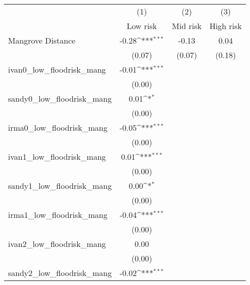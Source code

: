 {
\def\sym#1{\ifmmode^{#1}\else\(^{#1}\)\fi}
\begin{tabular}{l*{3}{c}}
\hline\hline
                    &\multicolumn{1}{c}{(1)}&\multicolumn{1}{c}{(2)}&\multicolumn{1}{c}{(3)}\\
                    &\multicolumn{1}{c}{Low risk}&\multicolumn{1}{c}{Mid risk}&\multicolumn{1}{c}{High risk}\\
\hline
Mangrove Distance   &       -0.28\sym{***}&       -0.13         &        0.04         \\
                    &      (0.07)         &      (0.07)         &      (0.18)         \\
[1em]
ivan0\_low\_floodrisk\_mang&       -0.01\sym{***}&                     &                     \\
                    &      (0.00)         &                     &                     \\
[1em]
sandy0\_low\_floodrisk\_mang&        0.01\sym{*}  &                     &                     \\
                    &      (0.00)         &                     &                     \\
[1em]
irma0\_low\_floodrisk\_mang&       -0.05\sym{***}&                     &                     \\
                    &      (0.00)         &                     &                     \\
[1em]
ivan1\_low\_floodrisk\_mang&        0.01\sym{***}&                     &                     \\
                    &      (0.00)         &                     &                     \\
[1em]
sandy1\_low\_floodrisk\_mang&        0.00\sym{*}  &                     &                     \\
                    &      (0.00)         &                     &                     \\
[1em]
irma1\_low\_floodrisk\_mang&       -0.04\sym{***}&                     &                     \\
                    &      (0.00)         &                     &                     \\
[1em]
ivan2\_low\_floodrisk\_mang&        0.00         &                     &                     \\
                    &      (0.00)         &                     &                     \\
[1em]
sandy2\_low\_floodrisk\_mang&       -0.02\sym{***}&                     &                     \\

\end{tabular}}
